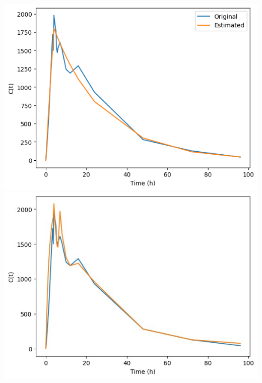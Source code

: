 \documentclass[12pt]{article}
\begin{document}
\begin{minipage}{0.48\linewidth}
	\includegraphics[width=2.0\linewidth]{results/basic_1.png}\newline
	\includegraphics[width=2.0\linewidth]{results/1.jpg}\newline
\end{minipage}
\end{document}
